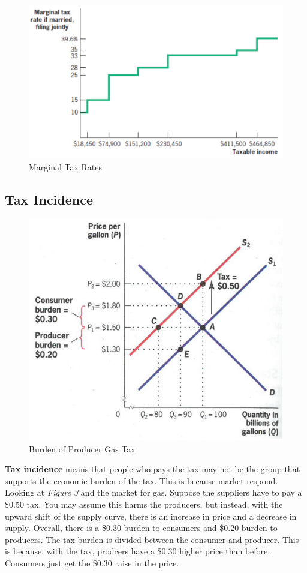 \documentclass{article}
\begin{document}
\begin{figure}[H]
    \centering
    \includegraphics[scale=0.35]{"Marginal Tax Rates"}
    \caption{Marginal Tax Rates}
\end{figure}

\subsection{ Tax Incidence }

\begin{figure}[H]
    \centering
    \includegraphics[scale=0.50]{"Burden of Producer Gas Tax"}
    \caption{Burden of Producer Gas Tax}
\end{figure}

\textbf{Tax incidence} means that people who pays the tax may not be the group
that supports the economic burden of the tax. This is because market respond.
Looking at \textit{Figure 3} and the market for gas. Suppose the suppliers have
to pay a \$0.50 tax. You may assume this harms the producers, but instead, with
the upward shift of the supply curve, there is an increase in price and a
decrease in supply. Overall, there is a \$0.30 burden to consumers and \$0.20
burden to producers. The tax burden is divided between the consumer and
producer. This is because, with the tax, prodcers have a \$0.30 higher price
than before. Consumers just get the \$0.30 raise in the price. 
\end{document}
